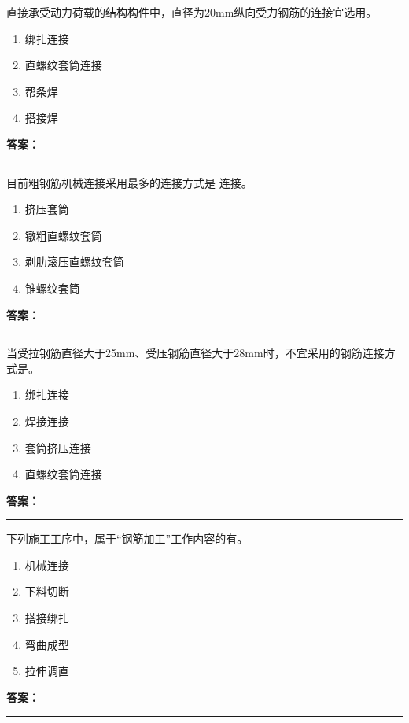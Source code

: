 \documentclass[UTF8,fontset=fandol,11pt]{ctexart}
\newcommand{\answerline}{\textcolor{answerred}{\rule{2.4cm}{0.7pt}}}
\begin{document}
\vspace{0.2em}

\begin{quizbox}[title={第 18 题}]
直接承受动力荷载的结构构件中，直径为20mm纵向受力钢筋的连接宜选用。\\
\begin{enumerate}[label=\Alph*.]
\item 绑扎连接
\item 直螺纹套筒连接
\item 帮条焊
\item 搭接焊
\end{enumerate}
\textbf{\textcolor{answerred}{答案：}} \answerline
\end{quizbox}

\vspace{0.2em}

\begin{quizbox}[title={第 19 题}]
目前粗钢筋机械连接采用最多的连接方式是 连接。\\
\begin{enumerate}[label=\Alph*.]
\item 挤压套筒
\item 镦粗直螺纹套筒
\item 剥肋滚压直螺纹套筒
\item 锥螺纹套筒
\end{enumerate}
\textbf{\textcolor{answerred}{答案：}} \answerline
\end{quizbox}

\vspace{0.2em}

\begin{quizbox}[title={第 20 题}]
当受拉钢筋直径大于25mm、受压钢筋直径大于28mm时，不宜采用的钢筋连接方式是。\\
\begin{enumerate}[label=\Alph*.]
\item 绑扎连接
\item 焊接连接
\item 套筒挤压连接
\item 直螺纹套筒连接
\end{enumerate}
\textbf{\textcolor{answerred}{答案：}} \answerline
\end{quizbox}

\vspace{0.2em}

\begin{quizbox}[title={第 21 题}]
下列施工工序中，属于“钢筋加工”工作内容的有。\\
\begin{enumerate}[label=\Alph*.]
\item 机械连接
\item 下料切断
\item 搭接绑扎
\item 弯曲成型
\item 拉伸调直
\end{enumerate}
\textbf{\textcolor{answerred}{答案：}} \answerline
\end{quizbox}
\end{document}
